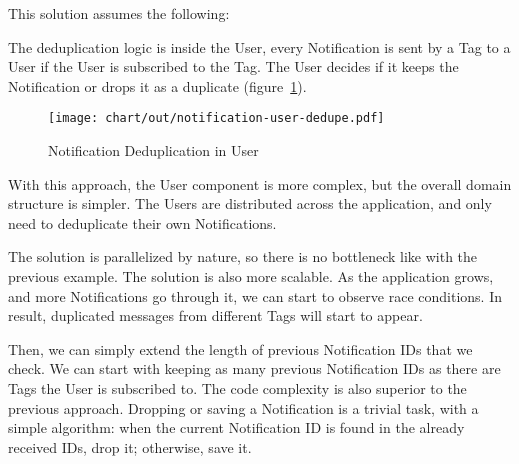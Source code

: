 This solution assumes the following:

The deduplication logic is inside the User,
every Notification is sent by a Tag to a User
if the User is subscribed to the Tag.
The User decides if it keeps the Notification
or drops it as a duplicate
(figure~\ref{fig:notification-user-dedupe}).

\begin{figure}[h]
  \centering
  \texttt{[image: chart/out/notification-user-dedupe.pdf]}
  \caption{Notification Deduplication in User}
  \label{fig:notification-user-dedupe}
\end{figure}

With this approach,
the User component is more complex,
but the overall domain structure is simpler.
The Users are distributed across the application,
and only need to deduplicate their own Notifications.

The solution is parallelized by nature,
so there is no bottleneck
like with the previous example.
The solution is also more scalable.
As the application grows,
and more Notifications go through it,
we can start to observe race conditions.
In result,
duplicated messages from different Tags
will start to appear.

Then, we can simply extend the length of
previous Notification \acp{ID} that we check.
We can start with keeping as many previous
Notification \acp{ID}
as there are Tags the User is subscribed to.
The code complexity is also superior
to the previous approach.
Dropping or saving a Notification is a trivial task,
with a simple algorithm:
when the current Notification \ac{ID} is found in the
already received \acp{ID}, drop it; otherwise, save it.
